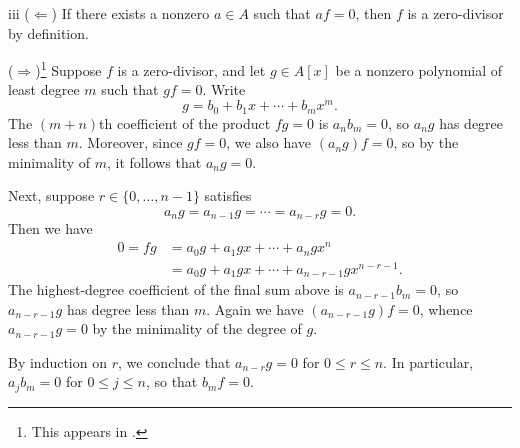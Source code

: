\begin{partsolution}{iii}
(\(\Leftarrow\))
If there exists a nonzero \(a \in A\) such that \(a f = 0\), then \(f\) is a zero-divisor by definition.

(\(\Rightarrow\))\footnote{%
This appears in \cite[Theorem 2]{McCoyDivisorsOfZero}.%
}
Suppose \(f\) is a zero-divisor, and let \(g \in A[x]\) be a nonzero polynomial of least degree \(m\) such that \(g f = 0\).
Write
\begin{equation*}
g = b_0 + b_1 x + \cdots + b_m x^m.
\end{equation*}
The \((m+n)\)th coefficient of the product \(f g = 0\) is \(a_n b_m = 0\), so \(a_n g\) has degree less than \(m\).
Moreover, since \(g f = 0\), we also have \((a_n g) f = 0\), so by the minimality of \(m\), it follows that \(a_n g = 0\).

Next, suppose \(r\in\{0,\ldots,n-1\}\) satisfies
\begin{equation*}
a_n g
= a_{n-1} g
= \cdots
= a_{n-r} g
= 0.
\end{equation*}
Then we have
\begin{align*}
0
= f g
&= a_0 g + a_1 g x + \cdots + a_n g x^n
\\&= a_0 g + a_1 g x + \cdots + a_{n-r-1} g x^{n-r-1}.
\end{align*}
The highest-degree coefficient of the final sum above is \(a_{n-r-1} b_m = 0\), so \(a_{n-r-1} g\) has degree less than \(m\).
Again we have \((a_{n-r-1} g) f = 0\), whence \(a_{n-r-1} g = 0\) by the minimality of the degree of \(g\).

By induction on \(r\), we conclude that \(a_{n-r} g = 0\) for \(0 \leq r \leq n\).
In particular, \(a_j b_m = 0\) for \(0\leq j \leq n\), so that \(b_m f = 0\).
\end{partsolution}

